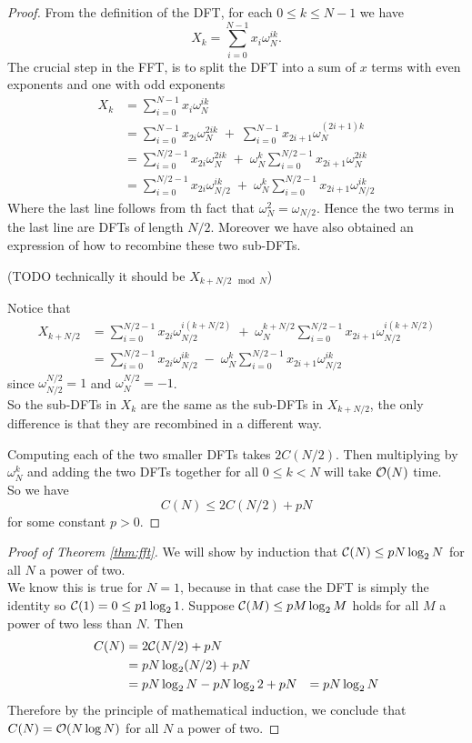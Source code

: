 \begin{proof}
From the definition of the DFT, for each $0 \le k \le N-1$ we have
\[
    X_k = \sum^{N-1}_{i=0}x_i\omega_N^{ik}.
\]
The crucial step in the FFT, is to split the DFT into a sum of $x$ terms with even exponents and one with odd exponents
\begin{align}
    X_k
    &= \sum^{N-1}_{i=0}x_i\omega_N^{ik} \nonumber\\
    &= \sum^{N-1}_{i=0}x_{2i}\omega_N^{2ik} \;+\; \sum^{N-1}_{i=0}x_{2i+1} \omega_N^{(2i+1)k} \nonumber\\
    &= \sum^{N/2-1}_{i=0}x_{2i}\omega_N^{2ik} \;+\; \omega_N^k \sum^{N/2-1}_{i=0}x_{2i+1}\omega_N^{2ik}\\
    &= \sum^{N/2-1}_{i=0}x_{2i}\omega_{N/2}^{ik} \;+\; \omega_N^k \sum^{N/2-1}_{i=0}x_{2i+1}\omega_{N/2}^{ik} \label{eq:keystep}
\end{align}
Where the last line follows from th fact that $\omega_N^2 = \omega_{N/2}$. Hence the two terms in the last line are DFTs of length $N/2$. Moreover we have also obtained an expression of how to recombine these two sub-DFTs.

(TODO technically it should be $X_{k + N/2 \mod N}$)

Notice that
\begin{align*}
    X_{k + N/2}
    &= \sum^{N/2-1}_{i=0}x_{2i}\omega_{N/2}^{i(k + N/2)} \;+\; \omega_N^{k+ N/2} \sum^{N/2-1}_{i=0}x_{2i+1}\omega_{N/2}^{i(k + N/2)}\\
    &= \sum^{N/2-1}_{i=0}x_{2i}\omega_{N/2}^{ik} \;-\; \omega_N^k \sum^{N/2-1}_{i=0}x_{2i+1}\omega_{N/2}^{ik}
\end{align*}
since $\omega_{N/2}^{N/2} = 1$ and $\omega_N^{N/2} = -1$.\\
So the sub-DFTs in $X_k$ are the same as the sub-DFTs in $X_{k + N/2}$, the only difference is that they are recombined in a different way.

Computing each of the two smaller DFTs takes $2C(N/2)$. Then multiplying by $\omega^k_N$ and adding the two DFTs together for all $0 \leq k < N$ will take $\mathcal O(N)$ time. \\
So we have
\[
    C(N) \le 2 C(N/2) + pN
\]
for some constant $p > 0$.
\end{proof}

\begin{proof}[Proof of Theorem \ref{thm:fft}]
    We will show by induction that $\mathcal C(N) \le pN\log_2 N$ for all $N$ a power of two.\\
    We know this is true for $N = 1$, because in that case the DFT is simply the identity so $\mathcal C(1) = 0 \le p1 \log_2 1$.
    Suppose $\mathcal C(M) \le pM\log_2 M$ holds for all $M$ a power of two less than $N$. Then
    \begin{align*}
        C(N)
        &= 2\mathcal C(N/2) + pN\\
        &= pN\log_2 (N/2) + pN\\
        &= pN\log_2 N - pN\log_2 2 + pN
        &= pN\log_2 N
    \end{align*}
    Therefore by the principle of mathematical induction, we conclude that $C(N) = \mathcal O(N \log N)$ for all $N$ a power of two.
\end{proof}

